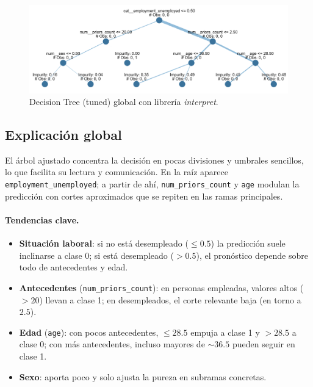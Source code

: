 \begin{figure}[h]
  \centering
  \includegraphics[width=0.92\linewidth]{figures/decision_tree_tunned_depth_global.png}
  \caption{Decision Tree (tuned) global con librería \textit{interpret}.}
  \label{fig:tree-tuned_global}
\end{figure}








\subsection{Explicación global}

El árbol ajustado concentra la decisión en pocas divisiones y umbrales sencillos, lo que facilita su lectura y comunicación. En la raíz aparece \texttt{employment\_unemployed}; a partir de ahí, \texttt{num\_priors\_count} y \texttt{age} modulan la predicción con cortes aproximados que se repiten en las ramas principales.

\paragraph{Tendencias clave.}
\begin{itemize}
  \item \textbf{Situación laboral}: si no está desempleado ($\leq 0.5$) la predicción suele inclinarse a clase 0; si está desempleado ($> 0.5$), el pronóstico depende sobre todo de antecedentes y edad.
  \item \textbf{Antecedentes} (\texttt{num\_priors\_count}): en personas empleadas, valores altos ($>20$) llevan a clase 1; en desempleados, el corte relevante baja (en torno a $2.5$).
  \item \textbf{Edad} (\texttt{age}): con pocos antecedentes, $\leq 28.5$ empuja a clase 1 y $>28.5$ a clase 0; con más antecedentes, incluso mayores de $\sim 36.5$ pueden seguir en clase 1.
  \item \textbf{Sexo}: aporta poco y solo ajusta la pureza en subramas concretas.
\end{itemize}

